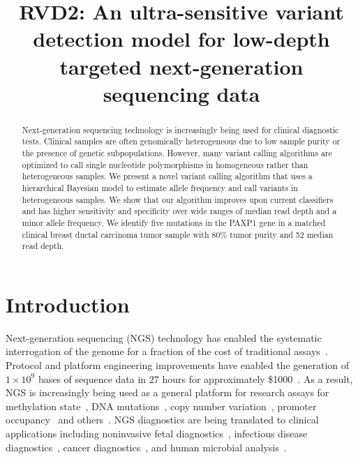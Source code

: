 \documentclass[11pt,reqno]{amsart}
\title[RVD2]{RVD2: An ultra-sensitive variant detection model for low-depth targeted next-generation sequencing data}
\author{}
\begin{document}

\begin{abstract}
Next-generation sequencing technology is increasingly being used for clinical diagnostic tests. Clinical samples are often genomically heterogeneous due to low sample purity or the presence of genetic subpopulations. However, many variant calling algorithms are optimized to call single nucleotide polymorphisms in homogeneous rather than heterogeneous samples. We present a novel variant calling algorithm that uses a hierarchical Bayesian model to estimate allele frequency and call variants in heterogeneous samples. We show that our algorithm improves upon current classifiers and has higher sensitivity and specificity over wide ranges of median read depth and a minor allele frequency. We identify five mutations in the PAXP1 gene in a matched clinical breast ductal carcinoma tumor sample with 80\% tumor purity and 52 median read depth.%
\end{abstract}

\maketitle

\section{Introduction}

Next-generation sequencing (NGS) technology has enabled the systematic interrogation of the genome for a fraction of the cost of traditional assays~\citep{Koboldt:2013kw}. Protocol and platform engineering improvements have enabled the generation of $1\times10^9$ bases of sequence data in 27 hours for approximately \$1000~\citep{Quail:2012hf}. As a result, NGS is increasingly being used as a general platform for research assays for methylation state~\citep{Laird:2010ab}, DNA mutations~\citep{Consortium:2013co}, copy number variation~\citep{Alkan:2009cr}, promoter occupancy~\citep{Ouyang:2009hc} and others~\citep{Rivera:2013ee}. NGS diagnostics are being translated to clinical applications including noninvasive fetal diagnostics~\citep{Kitzman:2012hea}, infectious disease diagnostics~\citep{Capobianchi:2012em}, cancer diagnostics~\citep{Navin:2010gu}, and human microbial analysis~\citep{Consortium:2013iz}. 
\end{document}

